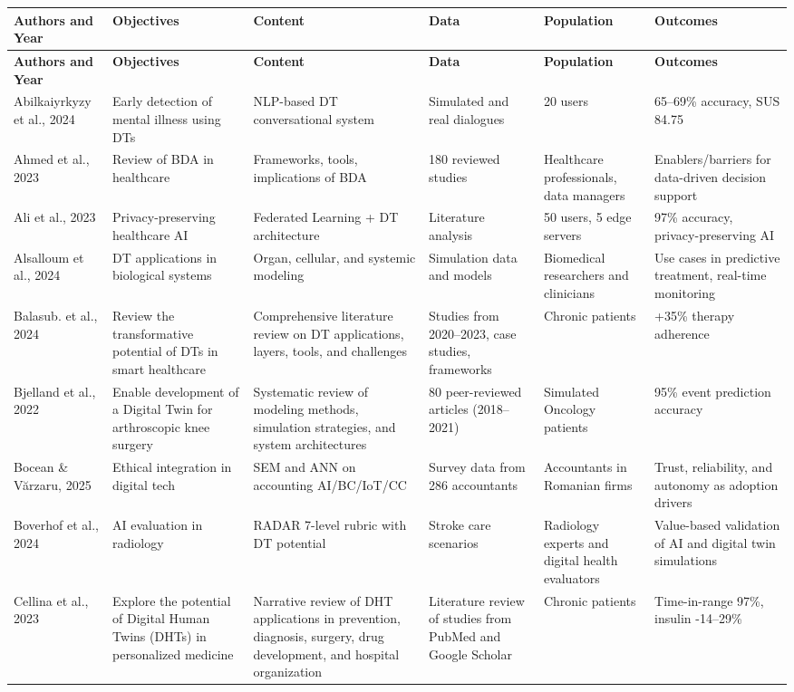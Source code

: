 \documentclass[10pt,a4paper]{article}
\begin{document}
\begin{small}
\begin{longtable}{|p{2cm}|p{2.8cm}|p{2.8cm}|p{2cm}|p{2cm}|p{3.2cm}|}
\hline
\textbf{Authors and Year} & \textbf{Objectives} & \textbf{Content} & \textbf{Data} & \textbf{Population} & \textbf{Outcomes} \\
\hline
\endfirsthead
\hline
\textbf{Authors and Year} & \textbf{Objectives} & \textbf{Content} & \textbf{Data} & \textbf{Population} & \textbf{Outcomes} \\
\hline
\endhead

Abilkaiyrkyzy et al., 2024 & Early detection of mental illness using DTs & NLP-based DT conversational system & Simulated and real dialogues & 20 users & 65–69\% accuracy, SUS 84.75 \\
\hline
Ahmed et al., 2023 & Review of BDA in healthcare & Frameworks, tools, implications of BDA & 180 reviewed studies & Healthcare professionals, data managers & Enablers/barriers for data-driven decision support \\
\hline
Ali et al., 2023 & Privacy-preserving healthcare AI & Federated Learning + DT architecture & Literature analysis & 50 users, 5 edge
servers & 97\% accuracy, privacy-preserving AI \\
\hline
Alsalloum et al., 2024 & DT applications in biological systems & Organ, cellular, and systemic modeling & Simulation data and models & Biomedical researchers and clinicians & Use cases in predictive treatment, real-time monitoring \\
\hline
Balasub. et al., 2024 & Review the transformative potential of DTs in smart healthcare & Comprehensive literature review on DT applications, layers, tools, and challenges & Studies from 2020–2023, case studies, frameworks & Chronic patients & +35\% therapy adherence \\
\hline

Bjelland et al., 2022 & Enable development of a Digital Twin for arthroscopic knee surgery & Systematic review of modeling methods, simulation strategies, and system architectures & 80 peer-reviewed articles (2018–2021) & Simulated Oncology patients & 95\% event prediction accuracy \\
\hline

Bocean \& Vărzaru, 2025 & Ethical integration in digital tech & SEM and ANN on accounting AI/BC/IoT/CC & Survey data from 286 accountants & Accountants in Romanian firms & Trust, reliability, and autonomy as adoption drivers \\
\hline
Boverhof et al., 2024 & AI evaluation in radiology & RADAR 7-level rubric with DT potential & Stroke care scenarios & Radiology experts and digital health evaluators & Value-based validation of AI and digital twin simulations \\
\hline
Cellina et al., 2023 & Explore the potential of Digital Human Twins (DHTs) in personalized medicine & Narrative review of DHT applications in prevention, diagnosis, surgery, drug development, and hospital organization & Literature review of studies from PubMed and Google Scholar & Chronic patients & Time-in-range 97\%, insulin -14–29\% \\
\hline


\end{longtable}
\end{small}
\end{document}
